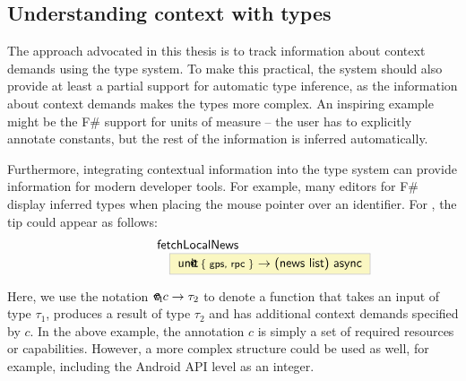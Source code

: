 
\newcommand{\introfuncblack}[3]{ \ident{#1 \hspace{-1em}\footnotesize{@} \{ #2 \}} $\rightarrow$ \ident{#3}  }
\newcommand{\introfunc}[3]{ \ident{#1 \hspace{-1em}\footnotesize{@} \aclrd{\{ #2 \}}} $\rightarrow$ \ident{#3}  }
\newcommand{\introvar}[2]{ \ident{#1 \hspace{-1em}\footnotesize{@} \cclrd{#2} } }


\subsection{Understanding context with types}

The approach advocated in this thesis is to track information about context demands using
the type system. To make this practical, the system should also provide at least a partial support for
automatic type inference, as the information about context demands makes the types more complex.
An inspiring example might be the F\# support for units of measure \cite{app-units} -- the user has
to explicitly annotate constants, but the rest of the information is inferred automatically.

Furthermore, integrating contextual information into the type system can provide information for
modern developer tools. For example, many editors for F\# display inferred types when placing the 
mouse pointer over an identifier. For , the tip could appear as follows:
%
\vspace{0.5em}
\begin{equation*}
\hspace{5em}
\begin{array}{l}
\ident{fetchLocalNews}\\
\hspace{1em} \fcolorbox{tooltipb}{tooltipy}{
	\introfuncblack{unit}{gps, rpc}{(news~list)~async}
}
\end{array}
\end{equation*}
\vspace{0.5em}

\noindent
Here, we use the notation $\tau_1 \,\textnormal{\sffamily \hspace{-1em}\footnotesize{@}}\, c \rightarrow \tau_2$ to denote
a function that takes an input of type $\tau_1$, produces a result of type $\tau_2$ and has additional
context demands specified by $c$. In the above example, the annotation $c$ is simply a set of
required resources or capabilities. However, a more complex structure could be used as well, for example,
including the Android API level as an integer.

